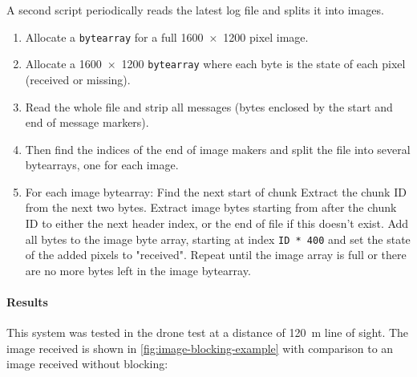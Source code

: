 \documentclass{report}
\begin{document}
A second script periodically reads the latest log file and splits it into images.

\begin{enumerate}
  \item Allocate a \texttt{bytearray} for a full \SI{1600x1200}{} pixel image.
  \item Allocate a \SI{1600x1200}{} \texttt{bytearray} where each byte is the state of each pixel (received or missing).
  \item Read the whole file and strip all messages (bytes enclosed by the start and end of message markers).
  \item Then find the indices of the end of image makers and split the file into several bytearrays, one for each image.
  \item For each image bytearray:
        \subitem Find the next start of chunk
        \subitem Extract the chunk ID from the next two bytes.
        \subitem Extract image bytes starting from after the chunk ID to either the next header index, or the end of file if this doesn't exist.
        \subitem Add all bytes to the image byte array, starting at index \texttt{ID * 400} and set the state of the added pixels to "received".
        \subitem Repeat until the image array is full or there are no more bytes left in the image bytearray.
\end{enumerate}

\paragraph{Results}

This system was tested in the drone test at a distance of \SI{120}{\meter} line of sight. The image received is shown in \ref{fig:image-blocking-example} with comparison to an image received without blocking:
\end{document}
